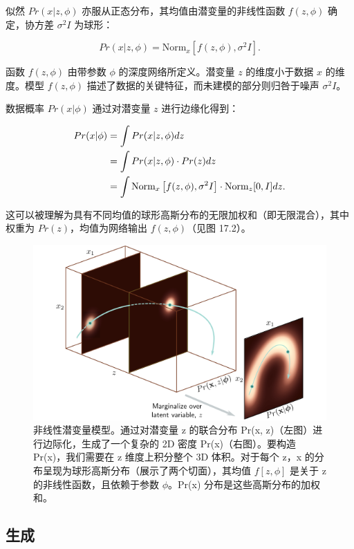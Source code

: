 似然 \(Pr(x|z, \phi)\) 亦服从正态分布，其均值由潜变量的非线性函数 \(f(z, \phi)\) 确定，协方差 \(\sigma^2 I\) 为球形：

\begin{equation}
Pr(x|z, \phi) = \text{Norm}_x\left[f(z, \phi), \sigma^2 I\right]. 
\end{equation}

函数 \(f(z, \phi)\) 由带参数 \(\phi\) 的深度网络所定义。潜变量 \(z\) 的维度小于数据 \(x\) 的维度。模型 \(f(z, \phi)\) 描述了数据的关键特征，而未建模的部分则归咎于噪声 \(\sigma^2I\)。

数据概率 \(Pr(x|\phi)\) 通过对潜变量 \(z\) 进行边缘化得到：


\begin{align}
Pr(x|\phi) &= \int Pr(x|z, \phi) dz \notag \\
&= \int Pr(x|z, \phi) \cdot Pr(z) dz \notag \\
&= \int \text{Norm}_x\left[f(z, \phi), \sigma^2 I\right] \cdot \text{Norm}_z[0, I] dz. 
\end{align} 


这可以被理解为具有不同均值的球形高斯分布的无限加权和（即无限混合），其中权重为 \(Pr(z)\)，均值为网络输出 \(f(z, \phi)\)（见图 17.2）。

\begin{figure}[ht!]
\centering
\includegraphics[width=0.7\linewidth]{png/chapter17/VAENonLinearLVM.png}
\caption{非线性潜变量模型。通过对潜变量 z 的联合分布 Pr(x, z)（左图）进行边际化，生成了一个复杂的 2D 密度 Pr(x)（右图）。要构造 Pr(x)，我们需要在 z 维度上积分整个 3D 体积。对于每个 z，x 的分布呈现为球形高斯分布（展示了两个切面），其均值 \(f[z, \phi]\) 是关于 z 的非线性函数，且依赖于参数 \(\phi\)。Pr(x) 分布是这些高斯分布的加权和。}
\end{figure}

\subsection{生成}

